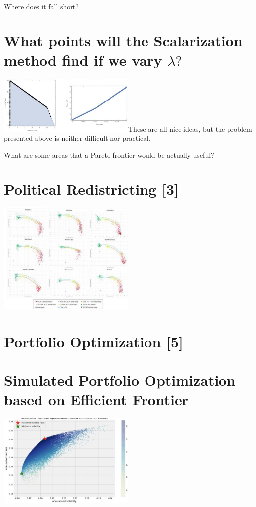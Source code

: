 Where does it fall short?

\section{What points will the Scalarization method find if we vary $\lambda ?$}
\includegraphics[width=0.5\textwidth]{optimization/multi-objective/images/2022_02_28_634e8079070800ac7e3cg-17}These are all nice ideas, but the problem presented above is neither difficult nor practical.

What are some areas that a Pareto frontier would be actually useful?

\section{Political Redistricting [3]}
\includegraphics[width=0.5\textwidth]{optimization/multi-objective/images/2022_02_28_634e8079070800ac7e3cg-19}

\section{Portfolio Optimization [5]}
\section{Simulated Portfolio Optimization based on Efficient Frontier}
\includegraphics[width=0.5\textwidth]{optimization/multi-objective/images/2022_02_28_634e8079070800ac7e3cg-20}

